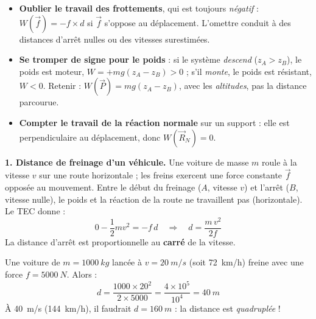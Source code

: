 \documentclass[11pt]{article}
\newcounter{popsec}
\newcounter{popsub}
\newcommand{\courssub}[1]{%
  \stepcounter{popsub}%
  \par\vspace{9pt}\noindent{\popxbold\fontsize{11.5}{13}\selectfont\color{popink}{\color{poporange}\thepopsec.\thepopsub}\hspace{6pt}#1}\par\nopagebreak\vspace{4pt}
}
\begin{document}
\begin{attention}
\begin{itemize}
\item \textbf{Oublier le travail des frottements}, qui est toujours \emph{négatif} : $W(\vec{f}) = -f \times d$ si $\vec{f}$ s'oppose au déplacement. L'omettre conduit à des distances d'arrêt nulles ou des vitesses surestimées.
\item \textbf{Se tromper de signe pour le poids} : si le système \emph{descend} ($z_A > z_B$), le poids est moteur, $W = +mg(z_A - z_B) > 0$ ; s'il \emph{monte}, le poids est résistant, $W < 0$. Retenir : $W(\vec P) = mg(z_A - z_B)$, avec les \emph{altitudes}, pas la distance parcourue.
\item \textbf{Compter le travail de la réaction normale} sur un support : elle est perpendiculaire au déplacement, donc $W(\vec{R}_N) = 0$.
\end{itemize}
\end{attention}

\courssub{Applications}

\textbf{1. Distance de freinage d'un véhicule.} Une voiture de masse $m$ roule à la vitesse $v$ sur une route horizontale ; les freins exercent une force constante $\vec{f}$ opposée au mouvement. Entre le début du freinage ($A$, vitesse $v$) et l'arrêt ($B$, vitesse nulle), le poids et la réaction de la route ne travaillent pas (horizontale). Le TEC donne :
\[ 0 - \frac{1}{2}m v^2 = -f\,d \quad\Longrightarrow\quad \boxed{d = \frac{m\,v^2}{2f}} \]
La distance d'arrêt est proportionnelle au \textbf{carré} de la vitesse.

\begin{exemplebox}
Une voiture de $m = \SI{1000}{kg}$ lancée à $v = \SI{20}{m/s}$ (soit \SI{72}{km/h}) freine avec une force $f = \SI{5000}{N}$. Alors :
\[ d = \frac{1000 \times 20^2}{2 \times 5000} = \frac{4\times 10^5}{10^4} = \SI{40}{m} \]
À \SI{40}{m/s} (\SI{144}{km/h}), il faudrait $d = \SI{160}{m}$ : la distance est \emph{quadruplée} !
\end{exemplebox}
\end{document}
